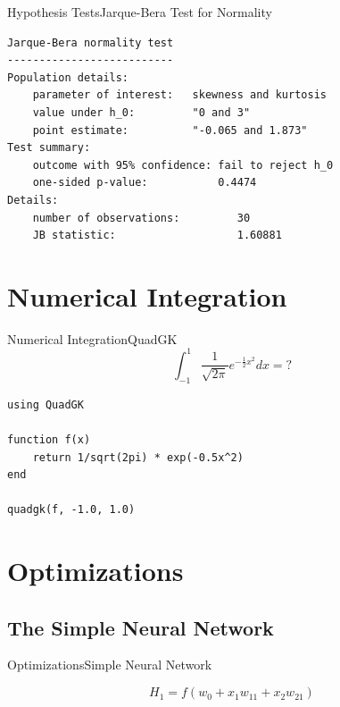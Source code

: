 \documentclass[11pt]{beamer}
\begin{document}
\begin{frame}[fragile]{Hypothesis Tests}{Jarque-Bera Test for Normality}
\begin{lstlisting}[basicstyle=\small]
Jarque-Bera normality test
--------------------------
Population details:
    parameter of interest:   skewness and kurtosis
    value under h_0:         "0 and 3"
    point estimate:          "-0.065 and 1.873"
Test summary:
    outcome with 95% confidence: fail to reject h_0
    one-sided p-value:           0.4474
Details:
    number of observations:         30
    JB statistic:                   1.60881
\end{lstlisting}
\end{frame}


\section{Numerical Integration}
\begin{frame}[fragile]{Numerical Integration}{QuadGK}
\begin{equation}
\int_{-1}^{1} \frac{1}{\sqrt{2\pi}} e^{-\frac{1}{2}x^2} dx = ?
\end{equation}
\begin{lstlisting}
using QuadGK

function f(x)
	return 1/sqrt(2pi) * exp(-0.5x^2)
end 

quadgk(f, -1.0, 1.0)
\end{lstlisting}
\end{frame}

\section{Optimizations}

\subsection{The Simple Neural Network}
\begin{frame}[fragile]{Optimizations}{Simple Neural Network}
\begin{center}
$$
H_1 = f(w_0 + x_1w_{11} + x_2w_{21})
$$
\end{center}
\end{frame}
\end{document}
